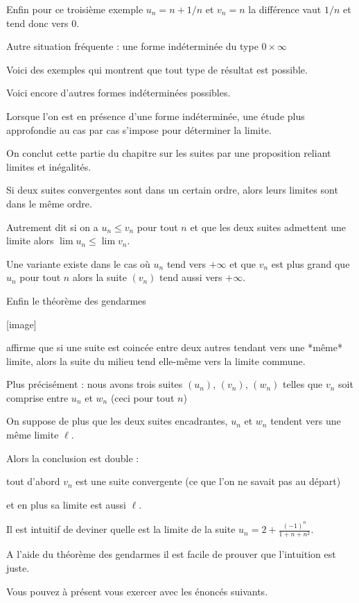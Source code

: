 \change

Enfin pour ce troisième exemple $u_n = n+1/n$  et $v_n=n$
la différence vaut $1/n$ et tend donc vers $0$.

\change

Autre situation fréquente : une forme indéterminée du type \og{} $0\times \infty$\fg{}

\change

Voici des exemples qui montrent que tout type de résultat 
est possible.

\change

Voici encore d'autres formes indéterminées possibles.

Lorsque l'on est en présence d'une forme indéterminée, 
une étude plus approfondie au cas par cas 
s'impose pour déterminer la limite.



\diapo

On conclut cette partie du chapitre sur les suites par une proposition reliant limites et inégalités.

Si deux suites convergentes sont dans un certain ordre, alors leurs limites sont dans le même ordre.

Autrement dit si on a $u_n \le v_n$ pour tout $n$ et que les deux suites admettent une limite alors
$\lim u_n \le \lim v_n$.

\change

Une variante existe dans le cas 
où $u_n$ tend vers $+\infty$ et que $v_n$ est plus grand que $u_n$ pour tout $n$ alors
la suite $(v_n)$ tend aussi vers $+\infty$.


\diapo

Enfin le théorème des  \og{}gendarmes  \fg{} 


\change

[image]

affirme que si une suite est coincée 
entre deux autres tendant vers une *même* limite, alors la suite du milieu tend elle-même vers la limite commune.

Plus précisément : nous avons trois suites $(u_n)$, $(v_n)$, $(w_n)$
telles que $v_n$ soit comprise entre $u_n$ et $w_n$ (ceci pour tout $n$)

On suppose de plus que les deux suites encadrantes, $u_n$ et $w_n$ tendent vers une même limite $\ell$.

Alors la conclusion est double :

tout d'abord $v_n$ est une suite convergente (ce que l'on ne savait pas au départ)

et en plus sa limite est aussi $\ell$.


\change
Il est intuitif de deviner quelle est la limite de la suite $u_n =2 +\frac{(-1)^n}{1+n+n^2}$.

A l'aide du théorème des gendarmes il est facile de prouver que l'intuition est juste.

\diapo

 Vous pouvez à présent vous exercer avec les énoncés suivants.




